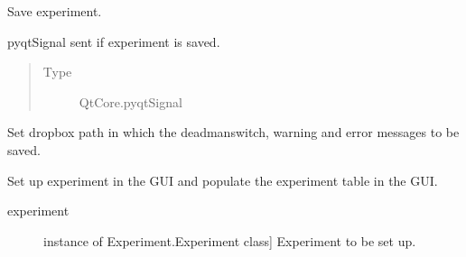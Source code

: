 \documentclass[letterpaper,10pt,english]{sphinxmanual}
\begin{document}
\begin{fulllineitems}
\begin{fulllineitems}
\end{fulllineitems}


\begin{fulllineitems}
\label{\detokenize{NoSeMazeControl/main:main.MainApp.save_experiment}}
\pysigstartsignatures
{}
\pysigstopsignatures
\sphinxAtStartPar
Save experiment.

\end{fulllineitems}


\begin{fulllineitems}
\label{\detokenize{NoSeMazeControl/main:main.MainApp.saved}}
\pysigstartsignatures
{}
\pysigstopsignatures
\sphinxAtStartPar
pyqtSignal sent if experiment is saved.
\begin{quote}\begin{description}
\item[{Type}] \leavevmode
\sphinxAtStartPar
QtCore.pyqtSignal

\end{description}\end{quote}

\end{fulllineitems}


\begin{fulllineitems}
\label{\detokenize{NoSeMazeControl/main:main.MainApp.set_dropbox_path}}
\pysigstartsignatures
{}
\pysigstopsignatures
\sphinxAtStartPar
Set dropbox path in which the deadman\sphinxhyphen{}switch, warning and error messages to be saved.

\end{fulllineitems}


\begin{fulllineitems}
\label{\detokenize{NoSeMazeControl/main:main.MainApp.setup_experiment_bindings}}
\pysigstartsignatures
{}
\pysigstopsignatures
\sphinxAtStartPar
Set up experiment in the GUI and populate the experiment table in the GUI.
\begin{description}
\item[{experiment}] \leavevmode{[}instance of Experiment.Experiment class{]}
\sphinxAtStartPar
Experiment to be set up.


\end{description}
\end{fulllineitems}
\end{fulllineitems}
\end{document}
